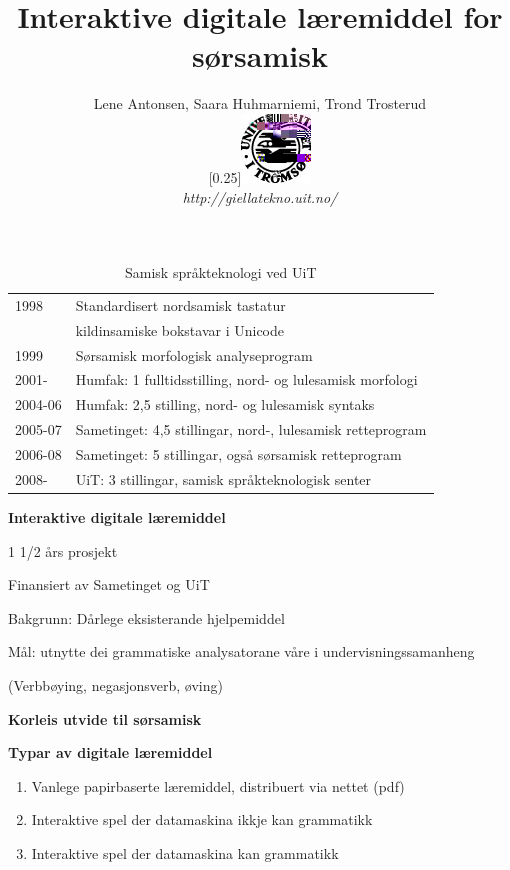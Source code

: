 \documentclass[landscape,norsk,11pt]{seminar}
\title{Interaktive digitale læremiddel for sørsamisk}
\author{Lene Antonsen, Saara Huhmarniemi, Trond Trosterud \\
  \scalebox{0.25}[0.25]{\includegraphics{img/logoWeb070sh.jpg}} \\
  \textit{http://giellatekno.uit.no/}}
\begin{document}
\begin{slide}

\maketitle



\newslide

\begin{table}[htdp]
\caption{Samisk språkteknologi ved UiT}
\begin{center}
\begin{tabular}{ll}
1998 &  Standardisert nordsamisk tastatur \\
     &  kildinsamiske bokstavar i Unicode \\
1999 &  Sørsamisk morfologisk analyseprogram \\
2001- &  Humfak: 1 fulltidsstilling, nord- og lulesamisk morfologi \\
2004-06 &  Humfak: 2,5 stilling, nord- og lulesamisk syntaks \\
2005-07 &  Sametinget: 4,5 stillingar, nord-, lulesamisk retteprogram \\
2006-08 &  Sametinget: 5 stillingar, også sørsamisk retteprogram \\
2008- &  UiT: 3 stillingar, samisk språkteknologisk senter \\
\end{tabular}
\end{center}
\label{default}
\end{table}%

\newslide

\textbf{Interaktive digitale læremiddel}

1 1/2 års prosjekt

Finansiert av Sametinget og UiT

Bakgrunn: Dårlege eksisterande hjelpemiddel

Mål: utnytte dei grammatiske analysatorane våre i undervisningssamanheng

(Verbbøying, negasjonsverb, øving)




\newslide

\textbf{Korleis utvide til sørsamisk}

\newslide

\textbf{Typar av digitale læremiddel}

\begin{enumerate}
\item{Vanlege papirbaserte læremiddel, distribuert via nettet (pdf)}
\item{Interaktive spel der datamaskina ikkje kan grammatikk}
\item{Interaktive spel der datamaskina kan grammatikk}
\end{enumerate}




\end{slide}
\end{document}

